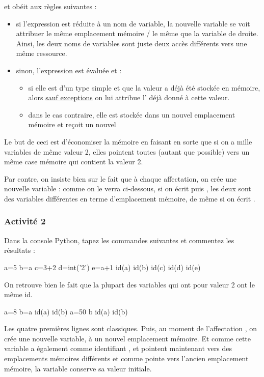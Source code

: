 \documentclass[11pt,a4paper,french,twoside]{PMCours}
\begin{document}
\smallskip
et obéit aux règles suivantes :
\begin{itemize}
\item si l'expression est réduite à un nom de variable, la nouvelle variable se
 voit attribuer le même emplacement mémoire / le même  que la variable 
 de droite. Ainsi, les deux noms de variables sont juste deux accès différents 
 vers une même ressource. %
\item sinon, l'expression est évaluée et :
\begin{itemize}
\item si elle est d'un type simple et que la valeur a déjà été stockée en 
mémoire, alors \uline{sauf exceptions} on lui attribue l' déjà donné à 
cette valeur.
\item dans le cas contraire,
elle est stockée dans un nouvel emplacement mémoire et reçoit un nouvel 
\end{itemize}
\end{itemize}

Le but de ceci est d'économiser la mémoire en faisant en sorte que si on a mille 
variables de même valeur 2, elles pointent toutes (autant que possible) vers un 
même case mémoire qui contient la valeur 2.

\medskip
Par contre, on insiste bien sur le fait que à chaque affectation, on crée une 
nouvelle variable : comme on le verra ci-dessous, si on écrit  puis 
, les deux  sont des variables différentes en terme 
d'emplacement mémoire, de même si on écrit .
\subsubsection*{Activité 2}
Dans la console Python, tapez les commandes suivantes et commentez les résultats :
\begin{Python}
a=5
b=a
c=3+2
d=int('2')
e=a+1
id(a)
id(b)
id(c)
id(d)
id(e)
\end{Python}
On retrouve bien le fait que la plupart des variables qui ont pour valeur 2 ont 
le même id.
\begin{Python}
a=8
b=a
id(a)
id(b)
a=50
b
id(a)
id(b)
\end{Python}

Les quatre premières lignes sont classiques. Puis, au moment de l'affectation 
, on crée une nouvelle variable, à un nouvel emplacement mémoire. 
Et comme cette variable a également comme identifiant ,  et 
 pointent maintenant vers des emplacements mémoires différents et comme 
 pointe vers l'ancien emplacement mémoire, la variable  conserve 
sa valeur initiale.
\end{document}
